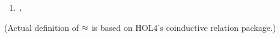 \begin{frame}[fragile]
\begin{small}
\begin{enumerate}
\begin{scriptsize}
\begin{alltt}
    (\HOLSymConst{\HOLTokenForall{}}.  \HOLTokenTransBegin\HOLSymConst{\ensuremath{\tau}}\HOLTokenTransEnd {} \HOLSymConst{\HOLTokenImp{}} \HOLSymConst{\HOLTokenExists{}}.  \HOLSymConst{\HOLTokenEPS}  \HOLSymConst{\HOLTokenConj{}}   ) \HOLSymConst{\HOLTokenConj{}}
    \HOLSymConst{\HOLTokenForall{}}.  \HOLTokenTransBegin\HOLSymConst{\ensuremath{\tau}}\HOLTokenTransEnd {} \HOLSymConst{\HOLTokenImp{}} \HOLSymConst{\HOLTokenExists{}}.  \HOLSymConst{\HOLTokenEPS}  \HOLSymConst{\HOLTokenConj{}}   
\end{alltt}\end{scriptsize}
\item \begin{alltt}
 \HOLSymConst{\HOLTokenWeakEQ}  \HOLSymConst{\HOLTokenEquiv{}} \HOLSymConst{\HOLTokenExists{}}.    \HOLSymConst{\HOLTokenConj{}}  
\end{alltt}
\end{enumerate}
\end{small}
(Actual definition of $\approx$ is based on HOL4's coinductive relation package.)
\end{frame}

